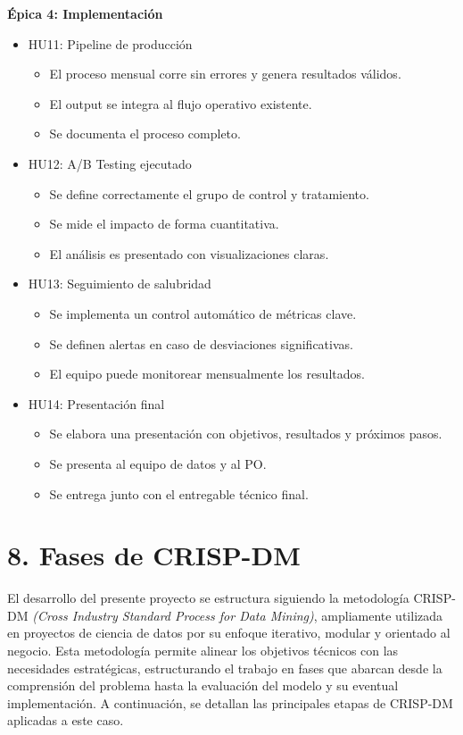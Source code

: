 \documentclass[
11pt, %
]{charter}
\begin{document}
\textbf{\'Epica 4: Implementación}
\begin{itemize}
  \item HU11: Pipeline de producción
  \begin{itemize}
    \item El proceso mensual corre sin errores y genera resultados válidos.
    \item El output se integra al flujo operativo existente.
    \item Se documenta el proceso completo.
  \end{itemize}
  \item HU12: A/B Testing ejecutado
  \begin{itemize}
    \item Se define correctamente el grupo de control y tratamiento.
    \item Se mide el impacto de forma cuantitativa.
    \item El análisis es presentado con visualizaciones claras.
  \end{itemize}
  \item HU13: Seguimiento de salubridad
  \begin{itemize}
    \item Se implementa un control automático de métricas clave.
    \item Se definen alertas en caso de desviaciones significativas.
    \item El equipo puede monitorear mensualmente los resultados.
  \end{itemize}
  \item HU14: Presentación final
  \begin{itemize}
    \item Se elabora una presentación con objetivos, resultados y próximos pasos.
    \item Se presenta al equipo de datos y al PO.
    \item Se entrega junto con el entregable técnico final.
  \end{itemize}
\end{itemize}

\section{8. Fases de CRISP-DM}

El desarrollo del presente proyecto se estructura siguiendo la metodología CRISP-DM  \textit{(Cross Industry Standard Process for Data Mining)}, ampliamente utilizada en proyectos de ciencia de datos por su enfoque iterativo, modular y orientado al negocio. Esta metodología permite alinear los objetivos técnicos con las necesidades estratégicas, estructurando el trabajo en fases que abarcan desde la comprensión del problema hasta la evaluación del modelo y su eventual implementación. A continuación, se detallan las principales etapas de CRISP-DM aplicadas a este caso.
\end{document}
